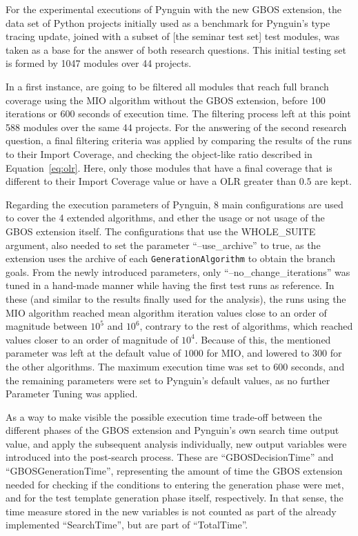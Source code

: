 \documentclass[%
  chapterprefix=false,%
  open=right,%
  twoside=true,%
  paper=a4,%
  logofile={Figures/logo.png},%
  thesistype=master,%
  UKenglish,%
]{se2thesis}
\newcommand{\classname}[1]{\texttt{#1}}
\begin{document}
For the experimental executions of Pynguin with the new GBOS extension, the data set of Python projects initially used as a benchmark for Pynguin's type tracing update, joined with a subset of [the seminar test set] test modules, was taken as a base for the answer of both research questions.
This initial testing set is formed by 1047 modules over 44 projects.

In a first instance, are going to be filtered all modules that reach full branch coverage using the MIO algorithm without the GBOS extension, before 100 iterations or 600 seconds of execution time.
The filtering process left at this point 588 modules over the same 44 projects.
For the answering of the second research question, a final filtering criteria was applied by comparing the  results of the runs to their Import Coverage, and checking the object-like ratio described in Equation~\ref{eq:olr}.
Here, only those modules that have a final coverage that is different to their Import Coverage value or have a OLR greater than \(0.5\) are kept.

Regarding the execution parameters of Pynguin, 8 main configurations are used to cover the 4 extended algorithms, and ether the usage or not usage of the GBOS extension itself.
The configurations that use the WHOLE\_SUITE argument, also needed to set the parameter ``--use\_archive'' to true, as the extension uses the archive of each \classname{GenerationAlgorithm} to obtain the branch goals.
From the newly introduced parameters, only ``--no\_change\_iterations'' was tuned in a hand-made manner while having the first test runs as reference.
In these (and similar to the results finally used for the analysis), the runs using the MIO algorithm reached mean algorithm iteration values close to an order of magnitude between \(10^5\) and \(10^6\), contrary to the rest of algorithms, which reached values closer to an order of magnitude of \(10^4\).
Because of this, the mentioned parameter was left at the default value of \(1000\) for MIO, and lowered to \(300\) for the other algorithms.
The maximum execution time was set to 600 seconds, and the remaining parameters were set to Pynguin's default values, as no further Parameter Tuning was applied.

As a way to make visible the possible execution time trade-off between the different phases of the GBOS extension and Pynguin's own search time output value, and apply the subsequent analysis individually, new output variables were introduced into the post-search process.
These are ``GBOSDecisionTime'' and ``GBOSGenerationTime'', representing the amount of time the GBOS extension needed for checking if the conditions to entering the generation phase were met, and for the test template generation phase itself, respectively.
In that sense, the time measure stored in the new variables is not counted as part of the already implemented ``SearchTime'', but are part of ``TotalTime''.
\end{document}
